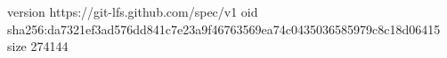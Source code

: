 version https://git-lfs.github.com/spec/v1
oid sha256:da7321ef3ad576dd841c7e23a9f46763569ea74c0435036585979c8c18d06415
size 274144
